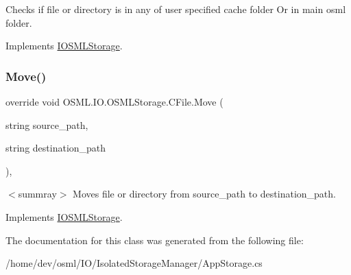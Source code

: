 Checks if file or directory is in any of user specified cache folder Or in main osml folder. 



Implements \mbox{\hyperlink{classIOSMLStorage_af3e0ef9f76c9739c3e685b1295cdf90a}{I\+O\+S\+M\+L\+Storage}}.

\mbox{\label{classOSML_1_1IO_1_1OSMLStorage_1_1CFile_a94ec4b71a537df1234a5ca44ae7bd825}} 
\subsubsection{\texorpdfstring{Move()}{Move()}}
{\footnotesize\ttfamily override void O\+S\+M\+L.\+I\+O.\+O\+S\+M\+L\+Storage.\+C\+File.\+Move (\begin{DoxyParamCaption}\item[{string}]{source\+\_\+path,  }\item[{string}]{destination\+\_\+path }\end{DoxyParamCaption})\hspace{0.3cm}{\ttfamily [inline]}, {\ttfamily [virtual]}}





$<$summray$>$ Moves file or directory from source\+\_\+path to destination\+\_\+path. 

Implements \mbox{\hyperlink{classIOSMLStorage_a8646a392bda2184f21ae3439d67240a5}{I\+O\+S\+M\+L\+Storage}}.



The documentation for this class was generated from the following file\+:\begin{DoxyCompactItemize}
\item 
/home/dev/osml/\+I\+O/\+Isolated\+Storage\+Manager/App\+Storage.\+cs\end{DoxyCompactItemize}
